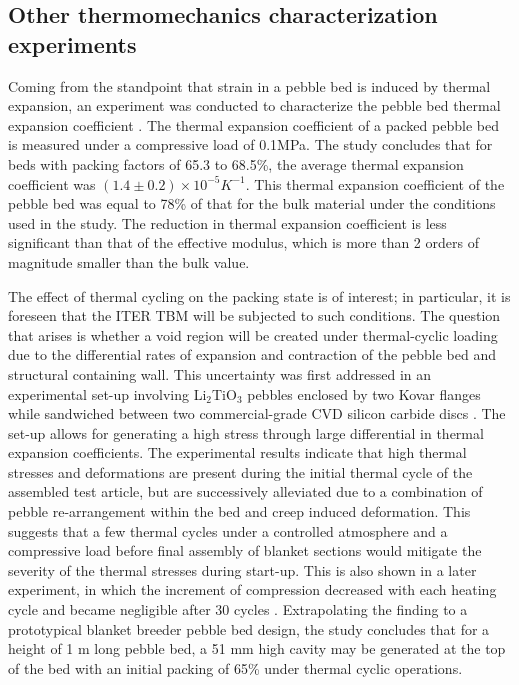 \subsection{Other thermomechanics characterization experiments}
Coming from the standpoint that strain in a pebble bed is induced by thermal expansion, an experiment was conducted to characterize the pebble bed thermal expansion coefficient \cite{Tanigawa:2007fc}.  The thermal expansion coefficient of a packed \lit pebble bed is measured under a compressive load of 0.1MPa.  The study concludes that for beds with packing factors of 65.3 to 68.5\%, the average thermal expansion coefficient was $(1.4\pm0.2)\times10^{-5}K^{-1}$. This thermal expansion coefficient of the pebble bed was equal to 78\% of that for the bulk material under the conditions used in the study. The reduction in thermal expansion coefficient is less significant than that of the effective modulus, which is more than 2 orders of magnitude smaller than the bulk value. 

The effect of thermal cycling on the packing state is of interest; in particular, it is foreseen that the ITER TBM will be subjected to such conditions. The question that arises is whether a void region will be created under thermal-cyclic loading due to the differential rates of expansion and contraction of the pebble bed and structural containing wall. This uncertainty was first addressed in an experimental set-up involving Li$_2$TiO$_3$ pebbles enclosed by two Kovar flanges while sandwiched between two commercial-grade CVD silicon carbide discs \cite{Calderoni:2006ye}. The set-up allows for generating a high stress through large differential in thermal expansion coefficients. The experimental results indicate that high thermal stresses and deformations are present during the initial thermal cycle of the assembled test article, but are successively alleviated due to a combination of pebble re-arrangement within the bed and creep induced deformation. This suggests that a few thermal cycles under a controlled atmosphere and a compressive load before final assembly of blanket sections would mitigate the severity of the thermal stresses during start-up. This is also shown in a later experiment, in which the increment of compression decreased with each heating cycle and became negligible after 30 cycles \cite{Tanigawa:2010cr}. Extrapolating the finding to a prototypical blanket breeder pebble bed design, the study concludes that for a height of 1 m long pebble bed, a 51 mm high cavity may be generated at the top of the bed with an initial packing of 65\% under thermal cyclic operations.  

